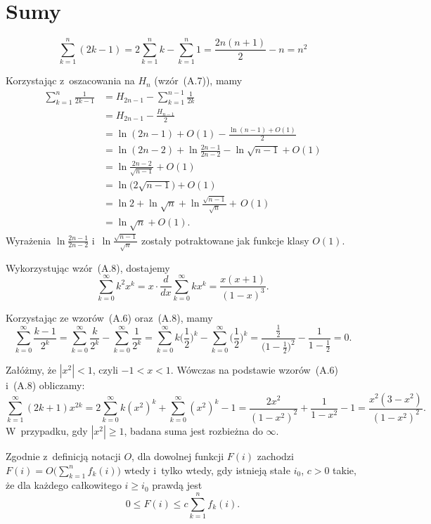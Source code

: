 \chapter{Sumy}


\exercise %
\[
	\sum_{k=1}^n(2k-1) = 2\sum_{k=1}^nk-\sum_{k=1}^n1 = \frac{2n(n+1)}{2}-n = n^2
\]

\exercise %
Korzystając z~oszacowania na $H_n$ (wzór~(A.7)), mamy
\begin{align*}
	\sum_{k=1}^n\frac{1}{2k-1} &= H_{2n-1}-\sum_{k=1}^{n-1}\frac{1}{2k} \\
	&= H_{2n-1}-\frac{H_{n-1}}{2} \\
	&= \ln(2n-1)+O(1)-\frac{\ln(n-1)+O(1)}{2} \\
	&= \ln(2n-2)+\ln\frac{2n-1}{2n-2}-\ln\sqrt{n-1}+O(1) \\
	&= \ln\frac{2n-2}{\sqrt{n-1}}+O(1) \\[1mm]
	&= \ln\bigl(2\sqrt{n-1}\bigr)+O(1) \\
	&= \ln2+\ln\sqrt{n}+\ln\frac{\sqrt{n-1}}{\sqrt{n}}+\,O(1) \\
	&= \ln\sqrt{n}+O(1).
\end{align*}
Wyrażenia $\ln\frac{2n-1}{2n-2}$ i~$\ln\frac{\sqrt{n-1}}{\sqrt{n}}$ zostały potraktowane jak funkcje klasy $O(1)$.

\exercise %
Wykorzystując wzór~(A.8), dostajemy
\[
	\sum_{k=0}^\infty k^2x^k = x\cdot\frac{d}{dx}\sum_{k=0}^\infty kx^k = \frac{x(x+1)}{(1-x)^3}.
\]

\exercise %
Korzystając ze wzorów~(A.6) oraz~(A.8), mamy
\[
	\sum_{k=0}^\infty\frac{k-1}{2^k} = \sum_{k=0}^\infty\frac{k}{2^k}-\sum_{k=0}^\infty\frac{1}{2^k} = \sum_{k=0}^\infty k\biggl(\frac{1}{2}\biggr)^k-\sum_{k=0}^\infty\biggl(\frac{1}{2}\biggr)^k = \frac{\frac{1}{2}}{\bigl(1-\frac{1}{2}\bigr)^2}-\frac{1}{1-\frac{1}{2}} = 0.
\]

\exercise %
Załóżmy, że $|x^2|<1$, czyli $-1<x<1$. Wówczas na podstawie wzorów~(A.6) i~(A.8) obliczamy:
\[
	\sum_{k=1}^\infty(2k+1)x^{2k} = 2\sum_{k=0}^\infty k(x^2)^k+\sum_{k=0}^\infty(x^2)^k-1 = \frac{2x^2}{(1-x^2)^2}+\frac{1}{1-x^2}-1 = \frac{x^2(3-x^2)}{(1-x^2)^2}.
\]
W~przypadku, gdy $|x^2|\ge1$, badana suma jest rozbieżna do $\infty$.

\exercise %

\noindent Zgodnie z~definicją notacji $O$, dla dowolnej funkcji $F(i)$ zachodzi $F(i)=O\bigl(\sum_{k=1}^nf_k(i)\bigr)$ wtedy i~tylko wtedy, gdy istnieją stałe $i_0$, $c>0$ takie, że dla każdego całkowitego $i\ge i_0$ prawdą jest
\[
	0 \le F(i) \le c\sum_{k=1}^nf_k(i).
\]

